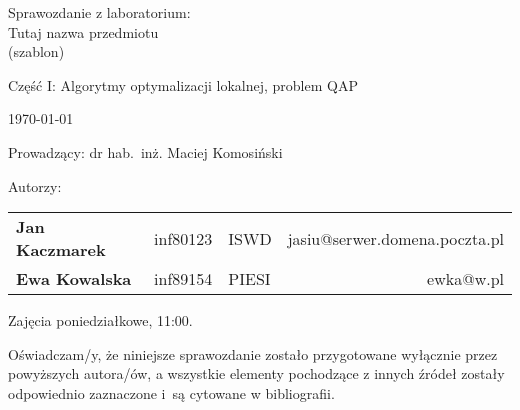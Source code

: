 \thispagestyle{empty} %

\begin{center}
{\large{Sprawozdanie z laboratorium:\\
Tutaj nazwa przedmiotu\\
(szablon)}}

\vspace{3ex}

Część I: Algorytmy optymalizacji lokalnej, problem QAP

\vspace{3ex}
{\footnotesize\today}

\end{center}


\vspace{10ex}

Prowadzący: dr hab.~inż. Maciej Komosiński

\vspace{5ex}

Autorzy:
\begin{tabular}{lllr}
\textbf{Jan Kaczmarek} & inf80123 & ISWD & jasiu@serwer.domena.poczta.pl \\
\textbf{Ewa Kowalska} & inf89154 & PIESI & ewka@w.pl \\
\end{tabular}

\vspace{5ex}

Zajęcia poniedziałkowe, 11:00.

\vspace{35ex}

\noindent Oświadczam/y, że niniejsze sprawozdanie zostało przygotowane wyłącznie przez powyższych autora/ów,
a wszystkie elementy pochodzące z innych źródeł zostały odpowiednio zaznaczone i~są cytowane w bibliografii.  

\newpage
